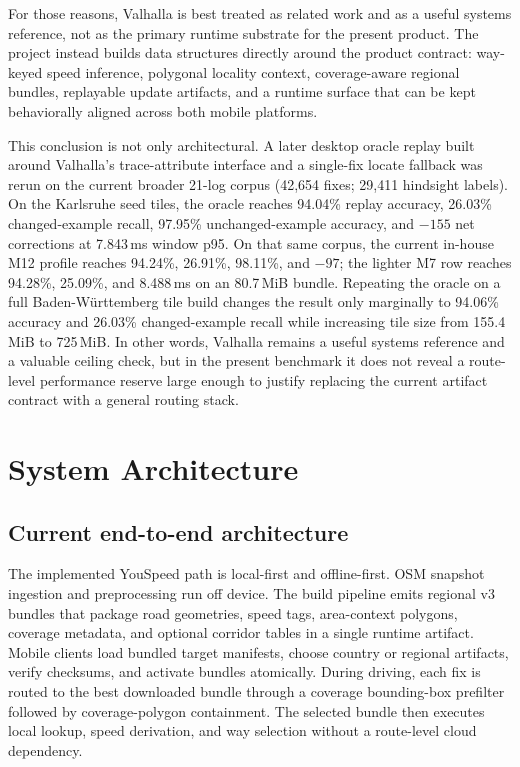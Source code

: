 \documentclass{article}
\begin{document}
For those reasons, Valhalla is best treated as related work and as a useful systems reference, not as the primary runtime substrate for the present product. The project instead builds data structures directly around the product contract: way-keyed speed inference, polygonal locality context, coverage-aware regional bundles, replayable update artifacts, and a runtime surface that can be kept behaviorally aligned across both mobile platforms.

This conclusion is not only architectural. A later desktop oracle replay built around Valhalla's trace-attribute interface and a single-fix locate fallback was rerun on the current broader 21-log corpus (42{,}654 fixes; 29{,}411 hindsight labels). On the Karlsruhe seed tiles, the oracle reaches 94.04\% replay accuracy, 26.03\% changed-example recall, 97.95\% unchanged-example accuracy, and \(-155\) net corrections at 7.843\,ms window p95. On that same corpus, the current in-house M12 profile reaches 94.24\%, 26.91\%, 98.11\%, and \(-97\); the lighter M7 row reaches 94.28\%, 25.09\%, and 8.488\,ms on an 80.7\,MiB bundle. Repeating the oracle on a full Baden-W\"urttemberg tile build changes the result only marginally to 94.06\% accuracy and 26.03\% changed-example recall while increasing tile size from 155.4\,MiB to 725\,MiB. In other words, Valhalla remains a useful systems reference and a valuable ceiling check, but in the present benchmark it does not reveal a route-level performance reserve large enough to justify replacing the current artifact contract with a general routing stack.

\section{System Architecture}
\subsection{Current end-to-end architecture}
The implemented YouSpeed path is local-first and offline-first. OSM snapshot ingestion and preprocessing run off device. The build pipeline emits regional v3 bundles that package road geometries, speed tags, area-context polygons, coverage metadata, and optional corridor tables in a single runtime artifact. Mobile clients load bundled target manifests, choose country or regional artifacts, verify checksums, and activate bundles atomically. During driving, each fix is routed to the best downloaded bundle through a coverage bounding-box prefilter followed by coverage-polygon containment. The selected bundle then executes local lookup, speed derivation, and way selection without a route-level cloud dependency.
\end{document}
